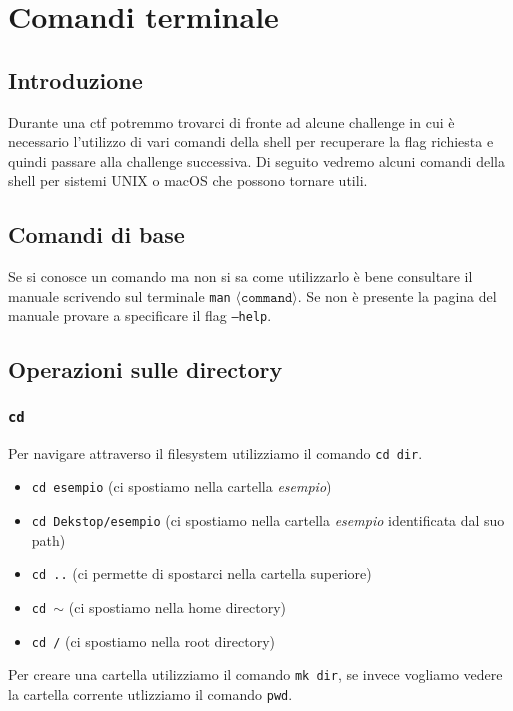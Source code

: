 \chapter{Comandi terminale}
\section{Introduzione}
Durante una ctf potremmo trovarci di fronte ad alcune challenge in cui è necessario l'utilizzo di vari comandi della shell per recuperare la flag richiesta e quindi passare alla challenge successiva.
Di seguito vedremo alcuni comandi della shell per sistemi UNIX o macOS che possono tornare utili.

\section{Comandi di base}
Se si conosce un comando ma non si sa come utilizzarlo è
bene consultare il manuale scrivendo sul terminale
\texttt{man} $\langle \texttt{command} \rangle$. Se non è presente
la pagina del manuale provare a specificare il flag \texttt{--help}. 

\section{Operazioni sulle directory}
\subsection{\texttt{cd}}
Per navigare attraverso il filesystem utilizziamo il
comando \texttt{cd dir}.
\begin{itemize}
    \item \texttt{cd esempio} (ci spostiamo nella cartella \textit{esempio})
    \item \texttt{cd Dekstop/esempio} (ci spostiamo nella cartella \textit{esempio} identificata dal suo path)
    \item \texttt{cd ..} (ci permette di spostarci nella cartella superiore)
    \item \texttt{cd $\sim$} (ci spostiamo nella home directory)
    \item \texttt{cd /} (ci spostiamo nella root directory)
\end{itemize}
Per creare una cartella utilizziamo il comando \texttt{mk dir},
se invece vogliamo vedere la cartella corrente utlizziamo
il comando \texttt{pwd}.

